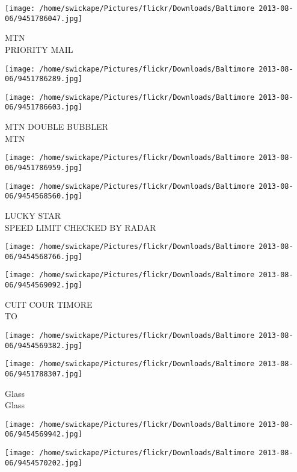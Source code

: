 \documentclass[10pt,letterpaper]{article}
\begin{document}
\vspace{0.25in}
\texttt{[image: /home/swickape/Pictures/flickr/Downloads/Baltimore 2013-08-06/9451786047.jpg]}

MTN\\
PRIORITY MAIL
\pagebreak

\texttt{[image: /home/swickape/Pictures/flickr/Downloads/Baltimore 2013-08-06/9451786289.jpg]}

\vspace{0.25in}
\texttt{[image: /home/swickape/Pictures/flickr/Downloads/Baltimore 2013-08-06/9451786603.jpg]}

MTN DOUBLE BUBBLER\\
MTN
\pagebreak

\texttt{[image: /home/swickape/Pictures/flickr/Downloads/Baltimore 2013-08-06/9451786959.jpg]}

\vspace{0.25in}
\texttt{[image: /home/swickape/Pictures/flickr/Downloads/Baltimore 2013-08-06/9454568560.jpg]}

LUCKY STAR\\
SPEED LIMIT CHECKED BY RADAR
\pagebreak

\texttt{[image: /home/swickape/Pictures/flickr/Downloads/Baltimore 2013-08-06/9454568766.jpg]}

\vspace{0.25in}
\texttt{[image: /home/swickape/Pictures/flickr/Downloads/Baltimore 2013-08-06/9454569092.jpg]}

CUIT COUR TIMORE\\
TO
\pagebreak

\texttt{[image: /home/swickape/Pictures/flickr/Downloads/Baltimore 2013-08-06/9454569382.jpg]}

\vspace{0.25in}
\texttt{[image: /home/swickape/Pictures/flickr/Downloads/Baltimore 2013-08-06/9451788307.jpg]}

Glass\\
Glass
\pagebreak

\texttt{[image: /home/swickape/Pictures/flickr/Downloads/Baltimore 2013-08-06/9454569942.jpg]}

\vspace{0.25in}
\texttt{[image: /home/swickape/Pictures/flickr/Downloads/Baltimore 2013-08-06/9454570202.jpg]}
\end{document}
